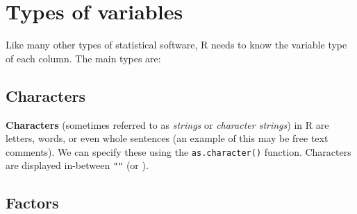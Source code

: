 \documentclass[]{book}
\makeatletter
\newenvironment{Shaded}{\begin{snugshade}}{\end{snugshade}}
\newcommand{\KeywordTok}[1]{\textcolor[rgb]{0.13,0.29,0.53}{\textbf{#1}}}
\newcommand{\DecValTok}[1]{\textcolor[rgb]{0.00,0.00,0.81}{#1}}
\newcommand{\StringTok}[1]{\textcolor[rgb]{0.31,0.60,0.02}{#1}}
\newcommand{\CommentTok}[1]{\textcolor[rgb]{0.56,0.35,0.01}{\textit{#1}}}
\newcommand{\OperatorTok}[1]{\textcolor[rgb]{0.81,0.36,0.00}{\textbf{#1}}}
\newcommand{\NormalTok}[1]{#1}
\newenvironment{kframe}{%
\medskip{}
\setlength{\fboxsep}{.8em}
 \def\at@end@of@kframe{}%
 \ifinner\ifhmode%
  \def\at@end@of@kframe{\end{minipage}}%
  \begin{minipage}{\columnwidth}%
 \fi\fi%
 \def\FrameCommand##1{\hskip\@totalleftmargin \hskip-\fboxsep
 \colorbox{shadecolor}{##1}\hskip-\fboxsep
     \hskip-\linewidth \hskip-\@totalleftmargin \hskip\columnwidth}%
 \MakeFramed {\advance\hsize-\width
   \@totalleftmargin\z@ \linewidth\hsize
   \@setminipage}}%
 {\par\unskip\endMakeFramed%
 \at@end@of@kframe}
\renewenvironment{Shaded}{\begin{kframe}}{\end{kframe}}
\theoremstyle{definition}
\theoremstyle{definition}
\theoremstyle{definition}
\theoremstyle{remark}
\makeatother
\begin{document}
\begin{Shaded}
\end{Shaded}

\section{Types of variables}\label{types-of-variables}

Like many other types of statistical software, R needs to know the
variable type of each column. The main types are:

\subsection{Characters}\label{characters}

\textbf{Characters} (sometimes referred to as \emph{strings} or
\emph{character strings}) in R are letters, words, or even whole
sentences (an example of this may be free text comments). We can specify
these using the \texttt{as.character()} function. Characters are
displayed in-between \texttt{""} (or
\texttt{\textquotesingle{}\textquotesingle{}}).

\subsection{Factors}\label{factors}
\end{document}
